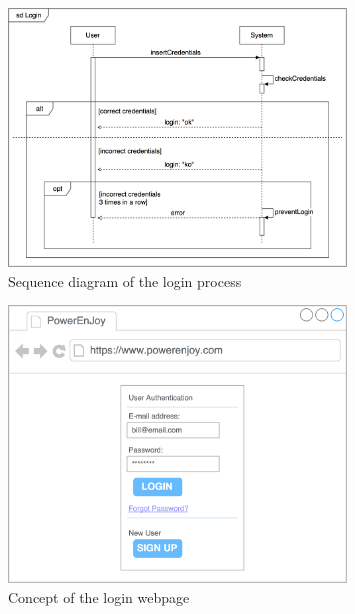 \begin{figure}[H]
\begin{center}
		\includegraphics[width=0.8\textwidth]{./specific_requirements/features/diagrams/login_sequence.png}
		\caption{Sequence diagram of the login process}
		\label{login_se}
\end{center}
\end{figure}

\begin{figure}[H]
\begin{center}
		\includegraphics[width=0.8\textwidth]{./specific_requirements/features/diagrams/web_login.png}
		\caption{Concept of the login webpage}
\end{center}
\end{figure}

